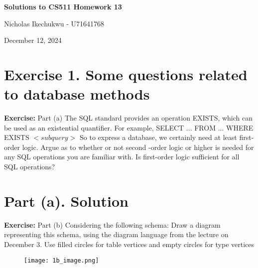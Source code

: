 \documentclass{article}
\begin{document}
\begin{center}
    \Large\textbf{Solutions to CS511 Homework 13}
    
    \vspace{0.5cm}
    
    \large Nicholas Ikechukwu - U71641768
    
    \vspace{0.3cm}
    
    \large December 12, 2024
\end{center}



\section*{Exercise 1. Some questions related to database methods}

\begin{mdframed}
    \vspace{1em}
        \textbf{Exercise:} Part (a) The SQL standard provides an operation EXISTS, which can be used as an existential
        quantifier. For example,
        SELECT ... FROM ... WHERE EXISTS \( < subquery > \)
        So to express a database, we certainly need at least first-order logic. Argue as to whether or not
        second -order logic or higher is needed for any SQL operations you are familiar with. Is first-order
        logic sufficient for all SQL operations?
    \vspace{1em}
\end{mdframed}


\section*{Part (a). Solution}

\newpage

\begin{mdframed}
    \vspace{1em}
        \textbf{Exercise:} Part (b) Considering the following schema:
        Draw a diagram representing this schema, using the diagram language from the lecture on December
        3. Use filled circles for table vertices and empty circles for type vertices  
\end{mdframed}
\begin{figure}[h!]
    \centering
    \texttt{[image: 1b\_image.png]} %
    \label{fig:sample-image}
\end{figure}  
\end{document}
